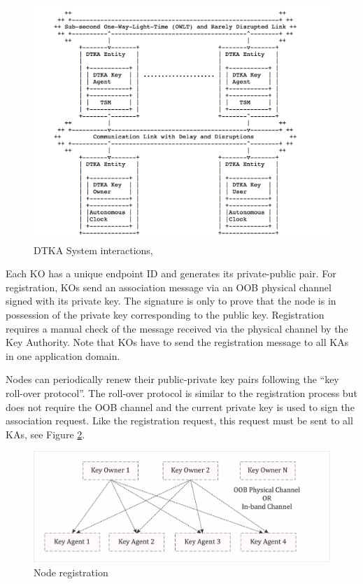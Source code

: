 \begin{figure}[htb]
\centering
\includegraphics[width=1 \linewidth]{images/DTKA.png} 
\caption{DTKA System interactions, \cite{burleigh-dtnwg-dtka-01}}
\label{fig:dtka}
\end{figure}

Each KO has a unique endpoint ID and generates its private-public pair. For registration, KOs send an association message via an OOB physical channel signed with its private key.  The signature is only to prove that the node is in possession of the private key corresponding to the public key. Registration requires a manual check of the message received via the physical channel by the Key Authority. Note that KOs have to send the registration message to all KAs in one application domain. 

Nodes can periodically renew their public-private key pairs following the ``key roll-over protocol''. The roll-over protocol is similar to the registration process but does not require the OOB channel and the current private key is used to sign the association request. Like the registration request, this request must be sent to all KAs, see Figure \ref{fig:Node registration}.

\begin{figure}[htb]
\centering
\includegraphics[width=1 \linewidth]{images/node-regist.png} 
\caption{Node registration}
\label{fig:Node registration}
\end{figure}

